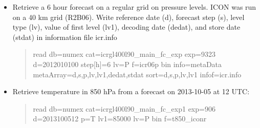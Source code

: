 \begin{itemize}
\item Retrieve a 6 hour forecast on a regular grid on pressure levels. ICON was run on a 40 km
grid (R2B06).  Write reference date (d),
forecast step (s), level type (lv), value of first level (lv1), decoding date (dedat), and
store date (stdat) in information file icr.info

\begin{quote}
read db=numex cat=icrgl400l90\_main\_fc\_exp exp=9323 d=2012010100 step[h]=6 lv=P f=icr06p bin info=metaData metaArray=d,s,p,lv,lv1,dedat,stdat sort=d,s,p,lv,lv1 infof=icr.info
\end{quote}

\item Retrieve temperature in 850 hPa from a forecast on 2013-10-05 at 12 UTC:

\begin{quote}
read db=numex cat=icrgl400l90\_main\_fc\_exp1 exp=906 d=2013100512 p=T lv1=85000 lv=P bin f=t850\_iconr
\end{quote}

\end{itemize}
